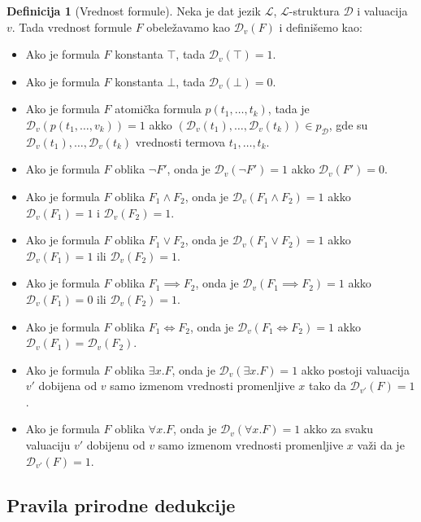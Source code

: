 \documentclass[a4paper,10pt]{article}
\theoremstyle{definition}
\newtheorem{definition}{Definicija}[section]
\begin{document}
\begin{definition}[Vrednost formule]
    Neka je dat jezik $\mathcal{L}$, $\mathcal{L}$-struktura $\mathcal{D}$ i valuacija $v$. Tada vrednost formule $F$ obeležavamo kao $\mathcal{D}_v (F)$ i definišemo kao:
    \begin{itemize}
        \item{Ako je formula $F$ konstanta $\top$, tada $\mathcal{D}_v(\top) = 1$.}
        \item{Ako je formula $F$ konstanta $\bot$, tada $\mathcal{D}_v(\bot) = 0$.}
        \item{Ako je formula $F$ atomička formula $p(t_1, \ldots, t_k)$, tada je $\mathcal{D}_v(p(t_1, \ldots, v_k)) = 1$ akko $(\mathcal{D}_v(t_1), \ldots, \mathcal{D}_v(t_k)) \in p_\mathcal{D}$, gde su $\mathcal{D}_v(t_1), \ldots, \mathcal{D}_v(t_k)$ vrednosti termova $t_1, \ldots, t_k$.}
        \item{Ako je formula $F$ oblika $\neg F'$, onda je $\mathcal{D}_v(\neg F') = 1$ akko $\mathcal{D}_v(F') = 0$.}
        \item{Ako je formula $F$ oblika $F_1 \land F_2$, onda je $\mathcal{D}_v(F_1 \land F_2) = 1$ akko $\mathcal{D}_v(F_1) = 1$ i $\mathcal{D}_v(F_2) = 1$.}
        \item{Ako je formula $F$ oblika $F_1 \lor F_2$, onda je $\mathcal{D}_v(F_1 \lor F_2) = 1$ akko $\mathcal{D}_v(F_1) = 1$ ili $\mathcal{D}_v(F_2) = 1$.}
        \item{Ako je formula $F$ oblika $F_1 \implies F_2$, onda je $\mathcal{D}_v(F_1 \implies F_2) = 1$ akko $\mathcal{D}_v(F_1) = 0$ ili $\mathcal{D}_v(F_2) = 1$.}
        \item{Ako je formula $F$ oblika $F_1 \iff F_2$, onda je $\mathcal{D}_v(F_1 \iff F_2) = 1$ akko $\mathcal{D}_v(F_1) = \mathcal{D}_v(F_2)$.}
        \item{Ako je formula $F$ oblika $\exists x. F$, onda je $\mathcal{D}_v(\exists x. F) = 1$ akko postoji valuacija $v'$ dobijena od $v$ samo izmenom vrednosti promenljive $x$ tako da $\mathcal{D}_{v'}(F) = 1$.}
        \item{Ako je formula $F$ oblika $\forall x. F$, onda je $\mathcal{D}_v(\forall x. F) = 1$ akko za svaku valuaciju $v'$ dobijenu od $v$ samo izmenom vrednosti promenljive $x$ važi da je $\mathcal{D}_{v'}(F) = 1$.}
    \end{itemize}
\end{definition}

\subsection{Pravila prirodne dedukcije}
\label{sub:natded}
\end{document}
